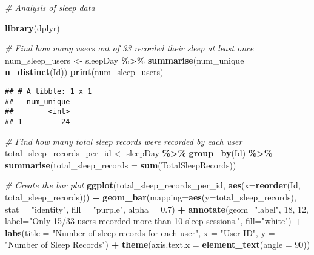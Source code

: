 \documentclass[
]{article}
\newenvironment{Shaded}{\begin{snugshade}}{\end{snugshade}}
\newcommand{\AttributeTok}[1]{\textcolor[rgb]{0.13,0.29,0.53}{#1}}
\newcommand{\CommentTok}[1]{\textcolor[rgb]{0.56,0.35,0.01}{\textit{#1}}}
\newcommand{\DecValTok}[1]{\textcolor[rgb]{0.00,0.00,0.81}{#1}}
\newcommand{\FloatTok}[1]{\textcolor[rgb]{0.00,0.00,0.81}{#1}}
\newcommand{\FunctionTok}[1]{\textcolor[rgb]{0.13,0.29,0.53}{\textbf{#1}}}
\newcommand{\NormalTok}[1]{#1}
\newcommand{\OtherTok}[1]{\textcolor[rgb]{0.56,0.35,0.01}{#1}}
\newcommand{\SpecialCharTok}[1]{\textcolor[rgb]{0.81,0.36,0.00}{\textbf{#1}}}
\newcommand{\StringTok}[1]{\textcolor[rgb]{0.31,0.60,0.02}{#1}}
\begin{document}
\begin{Shaded}
\begin{Highlighting}[]
\CommentTok{\# Analysis of sleep data}

\FunctionTok{library}\NormalTok{(dplyr)}

\CommentTok{\# Find how many users out of 33 recorded their sleep at least once}
\NormalTok{num\_sleep\_users }\OtherTok{\textless{}{-}}\NormalTok{ sleepDay }\SpecialCharTok{\%\textgreater{}\%}
  \FunctionTok{summarise}\NormalTok{(}\AttributeTok{num\_unique =} \FunctionTok{n\_distinct}\NormalTok{(Id))}
\FunctionTok{print}\NormalTok{(num\_sleep\_users)}
\end{Highlighting}
\end{Shaded}

\begin{verbatim}
## # A tibble: 1 x 1
##   num_unique
##        <int>
## 1         24
\end{verbatim}

\begin{Shaded}
\begin{Highlighting}[]
\CommentTok{\# Find how many total sleep records were recorded by each user}
\NormalTok{total\_sleep\_records\_per\_id }\OtherTok{\textless{}{-}}\NormalTok{ sleepDay }\SpecialCharTok{\%\textgreater{}\%}
  \FunctionTok{group\_by}\NormalTok{(Id) }\SpecialCharTok{\%\textgreater{}\%}
  \FunctionTok{summarise}\NormalTok{(}\AttributeTok{total\_sleep\_records =} \FunctionTok{sum}\NormalTok{(TotalSleepRecords))}

\CommentTok{\# Create the bar plot}
\FunctionTok{ggplot}\NormalTok{(total\_sleep\_records\_per\_id, }\FunctionTok{aes}\NormalTok{(}\AttributeTok{x=}\FunctionTok{reorder}\NormalTok{(Id, total\_sleep\_records))) }\SpecialCharTok{+}
  \FunctionTok{geom\_bar}\NormalTok{(}\AttributeTok{mapping=}\FunctionTok{aes}\NormalTok{(}\AttributeTok{y=}\NormalTok{total\_sleep\_records), }\AttributeTok{stat =} \StringTok{"identity"}\NormalTok{, }\AttributeTok{fill =} \StringTok{"purple"}\NormalTok{, }\AttributeTok{alpha =} \FloatTok{0.7}\NormalTok{) }\SpecialCharTok{+} 
  \FunctionTok{annotate}\NormalTok{(}\AttributeTok{geom=}\StringTok{"label"}\NormalTok{, }\DecValTok{18}\NormalTok{, }\DecValTok{12}\NormalTok{, }\AttributeTok{label=}\StringTok{"Only 15/33 users recorded more than}
\StringTok{           10 sleep sessions."}\NormalTok{, }\AttributeTok{fill=}\StringTok{"white"}\NormalTok{) }\SpecialCharTok{+}
  \FunctionTok{labs}\NormalTok{(}\AttributeTok{title =} \StringTok{"Number of sleep records for each user"}\NormalTok{,}
       \AttributeTok{x =} \StringTok{"User ID"}\NormalTok{,}
       \AttributeTok{y =} \StringTok{"Number of Sleep Records"}\NormalTok{) }\SpecialCharTok{+}
  \FunctionTok{theme}\NormalTok{(}\AttributeTok{axis.text.x =} \FunctionTok{element\_text}\NormalTok{(}\AttributeTok{angle =} \DecValTok{90}\NormalTok{))}
\end{Highlighting}
\end{Shaded}
\end{document}
